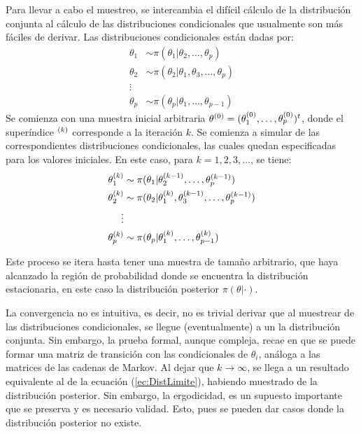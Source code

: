 \documentclass[../Main/Main.tex]{subfiles}
\begin{document}
Para llevar a cabo el muestreo, se intercambia el difícil cálculo de la distribución conjunta al cálculo de las distribuciones condicionales que usualmente son más fáciles de derivar. Las distribuciones condicionales están dadas por: 
\begin{align}
	\theta_1 &\sim \pi(\theta_1|\theta_2,\ldots,\theta_p) \label{ec:DistCondicionales}\\
	\theta_2 &\sim \pi(\theta_2|\theta_1,\theta_3,\ldots,\theta_p)\nonumber \\ 
	\vdots \nonumber\\
	\theta_p &\sim \pi(\theta_p|\theta_1,\ldots,\theta_{p-1}) \nonumber
\end{align}
Se comienza con una muestra inicial arbitraria $\theta^{(0)} = (\theta_1^{(0)},\ldots,\theta_p^{(0)})^t$, donde el superíndice $^{(k)}$ corresponde a la iteración $k$. Se comienza a simular de las correspondientes distribuciones condicionales, las cuales quedan especificadas para los valores iniciales. En este caso, para $k = 1,2,3,\ldots$, se tiene:
\begin{align}
	\theta_1^{(k)} &\sim \pi(\theta_1|\theta_2^{(k-1)},\ldots,\theta_p^{(k-1)}) \label{ec:GibbsSampler}\\
	\theta_2^{(k)} &\sim \pi(\theta_2|\theta_1^{(k)},\theta_3^{(k-1)},\ldots,\theta_p^{(k-1)})\nonumber \\ 
	\vdots \nonumber\\
	\theta_p^{(k)} &\sim \pi(\theta_p|\theta_1^{(k)},\ldots,\theta_{p-1}^{(k)}) \nonumber
\end{align}

Este proceso se itera hasta tener una muestra de tamaño arbitrario, que haya alcanzado la región de probabilidad donde se encuentra la distribución estacionaria, en este caso la distribución posterior $\pi(\theta|\cdot)$.

La convergencia no es intuitiva, es decir, no es trivial derivar que al muestrear de las distribuciones condicionales, se llegue (eventualmente) a un la distribución conjunta. Sin embargo, la prueba formal, aunque compleja, recae en que se puede formar una matriz de transición con las condicionales de $\theta_i$, análoga a las matrices de las cadenas de Markov. Al dejar que  $k\rightarrow\infty$, se llega a un resultado equivalente al de la ecuación (\ref{ec:DistLimite}), habiendo muestrado de la distribución posterior. Sin embargo, la ergodicidad, es un supuesto importante que se preserva y es necesario validad. Esto, pues se pueden dar casos donde la distribución posterior no existe.
\end{document}
